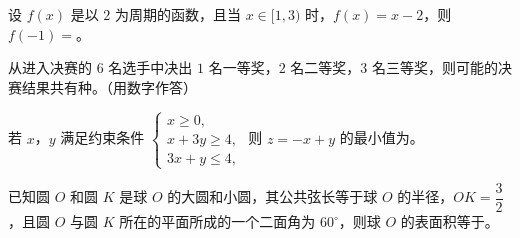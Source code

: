 \begin{question}
设 $f(x)$ 是以 $2$ 为周期的函数，且当 $x\in[1,3)$ 时，$f(x)=x-2$，则 $f(-1)=$\gkblank{}。

\end{question}
\begin{question}
从进入决赛的 $6$ 名选手中决出 $1$ 名一等奖，$2$ 名二等奖，$3$ 名三等奖，则可能的决赛结果共有\gkblank{}种。（用数字作答）

\end{question}
\begin{question}
若 $x$，$y$ 满足约束条件 $\begin{cases}x\geqslant0,\\ x+3y\geqslant4,\\ 3x+y\leqslant4,\end{cases}$ 则 $z=-x+y$ 的最小值为\gkblank{}。

\end{question}
\begin{question}
已知圆 $O$ 和圆 $K$ 是球 $O$ 的大圆和小圆，其公共弦长等于球 $O$ 的半径，$OK=\dfrac32$，且圆 $O$ 与圆 $K$ 所在的平面所成的一个二面角为 $60^\circ$，则球 $O$ 的表面积等于\gkblank{}。

\end{question}

